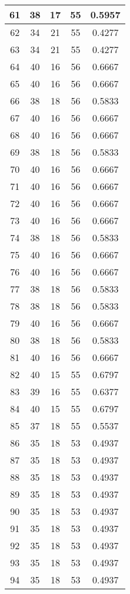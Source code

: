 \documentclass[letterpaper, 12pt]{article}
\begin{document}
\begin{longtable}{|c|c|c|c|c|}
\hline
61 & 38 & 17 & 55 & 0.5957 \\
\hline
62 & 34 & 21 & 55 & 0.4277 \\
\hline
63 & 34 & 21 & 55 & 0.4277 \\
\hline
64 & 40 & 16 & 56 & 0.6667 \\
\hline
65 & 40 & 16 & 56 & 0.6667 \\
\hline
66 & 38 & 18 & 56 & 0.5833 \\
\hline
67 & 40 & 16 & 56 & 0.6667 \\
\hline
68 & 40 & 16 & 56 & 0.6667 \\
\hline
69 & 38 & 18 & 56 & 0.5833 \\
\hline
70 & 40 & 16 & 56 & 0.6667 \\
\hline
71 & 40 & 16 & 56 & 0.6667 \\
\hline
72 & 40 & 16 & 56 & 0.6667 \\
\hline
73 & 40 & 16 & 56 & 0.6667 \\
\hline
74 & 38 & 18 & 56 & 0.5833 \\
\hline
75 & 40 & 16 & 56 & 0.6667 \\
\hline
76 & 40 & 16 & 56 & 0.6667 \\
\hline
77 & 38 & 18 & 56 & 0.5833 \\
\hline
78 & 38 & 18 & 56 & 0.5833 \\
\hline
79 & 40 & 16 & 56 & 0.6667 \\
\hline
80 & 38 & 18 & 56 & 0.5833 \\
\hline
81 & 40 & 16 & 56 & 0.6667 \\
\hline
82 & 40 & 15 & 55 & 0.6797 \\
\hline
83 & 39 & 16 & 55 & 0.6377 \\
\hline
84 & 40 & 15 & 55 & 0.6797 \\
\hline
85 & 37 & 18 & 55 & 0.5537 \\
\hline
86 & 35 & 18 & 53 & 0.4937 \\
\hline
87 & 35 & 18 & 53 & 0.4937 \\
\hline
88 & 35 & 18 & 53 & 0.4937 \\
\hline
89 & 35 & 18 & 53 & 0.4937 \\
\hline
90 & 35 & 18 & 53 & 0.4937 \\
\hline
91 & 35 & 18 & 53 & 0.4937 \\
\hline
92 & 35 & 18 & 53 & 0.4937 \\
\hline
93 & 35 & 18 & 53 & 0.4937 \\
\hline
94 & 35 & 18 & 53 & 0.4937 \\

\end{longtable}
\end{document}
